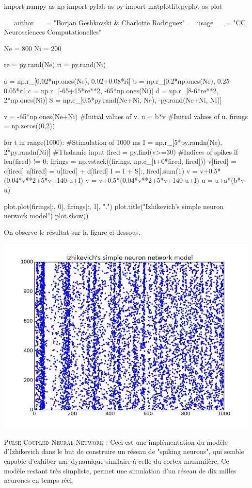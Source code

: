 \documentclass[10pt]{article}
\begin{document}
\begin{python}
import numpy as np
import pylab as py
import matplotlib.pyplot as plot

__author__ = "Borjan Geshkovski & Charlotte Rodriguez"
__usage__ = "CC Neurosciences Computationelles"

Ne = 800
Ni = 200

re = py.rand(Ne)
ri = py.rand(Ni)

a = np.r_[0.02*np.ones(Ne), 0.02+0.08*ri]
b = np.r_[0.2*np.ones(Ne), 0.25-0.05*ri]
c = np.r_[-65+15*re**2, -65*np.ones(Ni)]
d = np.r_[8-6*re**2, 2*np.ones(Ni)]
S = np.c_[0.5*py.rand(Ne+Ni, Ne), -py.rand(Ne+Ni, Ni)]

v = -65*np.ones(Ne+Ni)			#Initial values of v.
u = b*v 						#Initial values of u.
firings = np.zeros((0,2))

for t in range(1000): 			#Stimulation of 1000 ms
	I = np.r_[5*py.randn(Ne), 2*py.randn(Ni)] #Thalamic input
	fired = py.find(v>=30) 					  #Indices of spikes
	if len(fired) != 0:
		firings = np.vstack((firings, np.c_[t+0*fired, fired]))
		v[fired] = c[fired]
		u[fired] = u[fired] + d[fired]
		I = I + S[:, fired].sum(1)
	v = v+0.5*(0.04*v**2+5*v+140-u+I)
	v = v+0.5*(0.04*v**2+5*v+140-u+I)
	u = u+a*(b*v-u)

plot.plot(firings[:, 0], firings[:, 1],  ".")
plot.title("Izhikevich's simple neuron network model")
plot.show()
\end{python}
\justify
On observe le résultat sur la figure ci-dessous.

\begin{center}
\includegraphics[scale=0.5]{figure_10}
\end{center}
\justify
\textsc{Pulse-Coupled Neural Network :} Ceci est une impl\'ementation du modèle d'Izhikevich dans le but de construire un réseau de "spiking neurons", qui semble capable d'exhiber une dynamique similaire \`a celle du cortex mammifère. Ce modèle restant très simpliste, permet une simulation d'un réseau de dix milles neurones en temps r\'eel.
\end{document}
